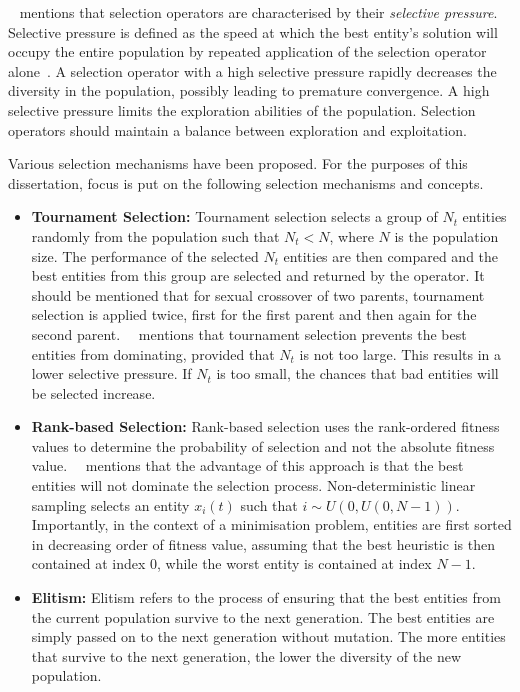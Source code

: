 \noindent
\citeauthor{ref:engelbrecht:2007}~\cite{ref:engelbrecht:2007} mentions that selection operators are characterised by their \textit{selective pressure}. Selective pressure is defined as the speed at which the best entity's solution will occupy the entire population by repeated application of the selection operator alone~\cite{ref:back:1994}. A selection operator with a high selective pressure rapidly decreases the diversity in the population, possibly leading to premature convergence. A high selective pressure limits the exploration abilities of the population. Selection operators should maintain a balance between exploration and exploitation.

Various selection mechanisms have been proposed. For the purposes of this dissertation, focus is put on the following selection mechanisms and concepts.

\begin{itemize}
      \item \textbf{Tournament Selection:} Tournament selection selects a group of $N_{t}$ entities randomly from the population such that $N_{t} < N$, where $N$ is the population size. The performance of the selected $N_{t}$ entities are then compared and the best entities from this group are selected and returned by the operator. It should be mentioned that for sexual crossover of two parents, tournament selection is applied twice, first for the first parent and then again for the second parent.~\citeauthor{ref:engelbrecht:2007}~\cite{ref:engelbrecht:2007} mentions that tournament selection prevents the best entities from dominating, provided that $N_{t}$ is not too large. This results in a lower selective pressure. If $N_{t}$ is too small, the chances that bad entities will be selected increase.

      \item \textbf{Rank-based Selection:} Rank-based selection uses the rank-ordered fitness values to determine the probability of selection and not the absolute fitness value.~\citeauthor{ref:engelbrecht:2007}~\cite{ref:engelbrecht:2007} mentions that the advantage of this approach is that the best entities will not dominate the selection process. Non-deterministic linear sampling selects an entity $x_{i}(t)$ such that $i \sim U(0, U(0, N - 1))$. Importantly, in the context of a minimisation problem, entities are first sorted in decreasing order of fitness value, assuming that the best heuristic is then contained at index 0, while the worst entity is contained at index $N - 1$.

      \item \textbf{Elitism:} Elitism refers to the process of ensuring that the best entities from the current population survive to the next generation. The best entities are simply passed on to the next generation without mutation. The more entities that survive to the next generation, the lower the diversity of the new population.
\end{itemize}


